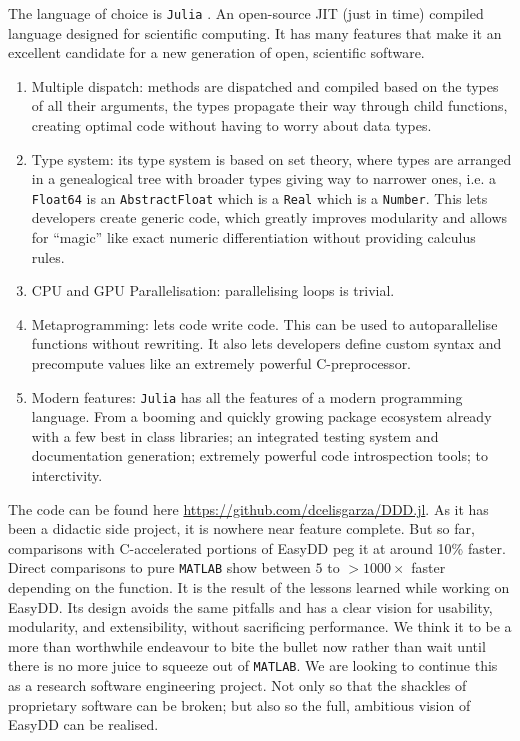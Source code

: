 The language of choice is \texttt{Julia} \cite{julia}. An open-source JIT (just in time) compiled language designed for scientific computing. It has many features that make it an excellent candidate for a new generation of open, scientific software.
\begin{enumerate}
    \item Multiple dispatch: methods are dispatched and compiled based on the types of all their arguments, the types propagate their way through child functions, creating optimal code without having to worry about data types.
    \item Type system: its type system is based on set theory, where types are arranged in a genealogical tree with broader types giving way to narrower ones, i.e. a \texttt{Float64} is an \texttt{AbstractFloat} which is a \texttt{Real} which is a \texttt{Number}. This lets developers create generic code, which greatly improves modularity and allows for ``magic'' like exact numeric differentiation without providing calculus rules.
    \item CPU and GPU Parallelisation: parallelising loops is trivial.
    \item Metaprogramming: lets code write code. This can be used to autoparallelise functions without rewriting. It also lets developers define custom syntax and precompute values like an extremely powerful C-preprocessor.
    \item Modern features: \texttt{Julia} has all the features of a modern programming language. From a booming and quickly growing package ecosystem already with a few best in class libraries; an integrated testing system and documentation generation; extremely powerful code introspection tools; to interctivity.
\end{enumerate}

The code can be found here \href{https://github.com/dcelisgarza/DDD.jl}{https://github.com/dcelisgarza/DDD.jl}. As it has been a didactic side project, it is nowhere near feature complete. But so far, comparisons with C-accelerated portions of EasyDD peg it at around 10\% faster. Direct comparisons to pure \texttt{MATLAB} show between $5$ to $>1000 \times$ faster depending on the function. It is the result of the lessons learned while working on EasyDD. Its design avoids the same pitfalls and has a clear vision for usability, modularity, and extensibility, without sacrificing performance. We think it to be a more than worthwhile endeavour to bite the bullet now rather than wait until there is no more juice to squeeze out of \texttt{MATLAB}. We are looking to continue this as a research software engineering project. Not only so that the shackles of proprietary software can be broken; but also so the full, ambitious vision of EasyDD can be realised.

